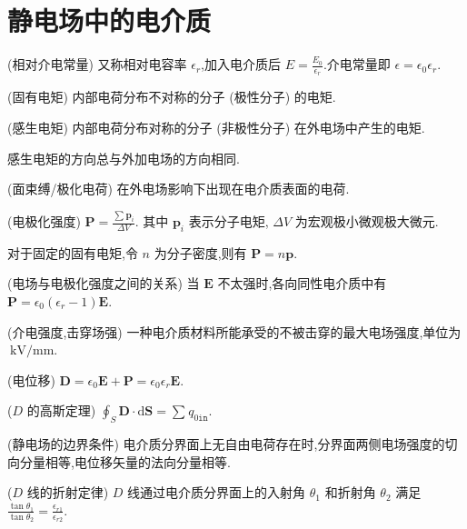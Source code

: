     \section{静电场中的电介质}
    \begin{definition}
        (相对介电常量) 又称相对电容率 $\epsilon_{r}$,加入电介质后 $E=\frac{E_0}{\epsilon_r}$.介电常量即 $\epsilon=\epsilon_0\epsilon_{r}$.
    \end{definition}
    \begin{definition}
        (固有电矩) 内部电荷分布不对称的分子 (极性分子) 的电矩.
    \end{definition}
    \begin{definition}
        (感生电矩) 内部电荷分布对称的分子 (非极性分子) 在外电场中产生的电矩.
    \end{definition}
    感生电矩的方向总与外加电场的方向相同.
    \begin{definition}
        (面束缚/极化电荷) 在外电场影响下出现在电介质表面的电荷.
    \end{definition}
    \begin{definition}
        (电极化强度) $\bm{P}=\frac{\sum_{}^{}\bm{p}_{i}}{\Delta V}$. 其中 $\bm{p}_{i}$ 表示分子电矩, $\Delta V$ 为宏观极小微观极大微元.
    \end{definition}
    对于固定的固有电矩,令 $n$ 为分子密度,则有 $\bm{P}=n \bm{p}$.
    \begin{theorem}
        (电场与电极化强度之间的关系) 当 $\bm{E}$ 不太强时,各向同性电介质中有 $\bm{P}=\epsilon_0(\epsilon_{r}-1)\bm{E}$.
    \end{theorem}
    \begin{definition}
        (介电强度,击穿场强) 一种电介质材料所能承受的不被击穿的最大电场强度,单位为 $\ \mathrm{kV / mm}$.
    \end{definition}
    \begin{definition}
        (电位移) $\bm{D}=\epsilon_0 \bm{E}+\bm{P}=\epsilon_0\epsilon_r \bm{E}$.
    \end{definition}
    \begin{theorem}
        ($D$ 的高斯定理) $\oint_{S}^{}\bm{D}\cdot \mathrm{d}\bm{S}=\sum_{}^{}q_{0\texttt{in}}$.
    \end{theorem}
    \begin{theorem}
        (静电场的边界条件) 电介质分界面上无自由电荷存在时,分界面两侧电场强度的切向分量相等,电位移矢量的法向分量相等.
    \end{theorem}
    \begin{theorem}
        ($D$ 线的折射定律) $D$ 线通过电介质分界面上的入射角 $\theta_1$ 和折射角 $\theta_2$ 满足 $\frac{\tan \theta_1}{\tan\theta_2}=\frac{\epsilon_{r 1}}{\epsilon_{r 2}}$.
    \end{theorem}
